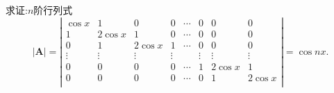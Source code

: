 \documentclass[../../main.tex]{subfiles}%
\begin{document}
\begin{exercise}\label{三对角行列式例题1}
求证:$n$阶行列式
\begin{equation}
|\boldsymbol{A}|=\left| \begin{matrix}
\cos x&		1&		0&		0&		\cdots&		0&		0&		0\\
1&		2\cos x&		1&		0&		\cdots&		0&		0&		0\\
0&		1&		2\cos x&		1&		\cdots&		0&		0&		0\\
\vdots&		\vdots&		\vdots&		\vdots&		&		\vdots&		\vdots&		\vdots\\
0&		0&		0&		0&		\cdots&		1&		2\cos x&		1\\
0&		0&		0&		0&		\cdots&		0&		1&		2\cos x\\
\end{matrix} \right|=\cos nx.
\nonumber
\end{equation}
\end{exercise}
\end{document}
